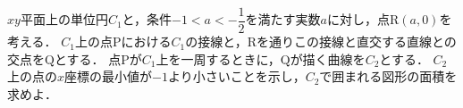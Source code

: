 \documentclass[../../main.tex]{subfiles}
\begin{document}
$xy$平面上の単位円$C_1$と，条件$-1<a<-\dfrac{1}{2}$を満たす実数$a$に対し，点$\mathrm{R}(a,0)$を考える．
$C_1$上の点$\mathrm{P}$における$C_1$の接線と，$\mathrm{R}$を通りこの接線と直交する直線との交点を$\mathrm{Q}$とする．
点$\mathrm{P}$が$C_1$上を一周するときに，$\mathrm{Q}$が描く曲線を$C_2$とする．
$C_2$上の点の$x$座標の最小値が$-1$より小さいことを示し，$C_2$で囲まれる図形の面積を求めよ．
\end{document}
